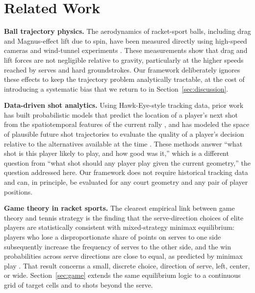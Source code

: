   \section{Related Work}\label{sec:related}

  \textbf{Ball trajectory physics.} The aerodynamics of racket-sport balls,
  including drag and Magnus-effect lift due to spin, have been measured directly
  using high-speed cameras and wind-tunnel experiments \cite{cross2014drag}.
  These measurements show that drag and lift forces are not negligible relative
  to gravity, particularly at the higher speeds reached by serves and hard
  groundstrokes. Our framework deliberately ignores these effects to keep the
  trajectory problem analytically tractable, at the cost of introducing a
  systematic bias that we return to in Section~\ref{sec:discussion}.

  \textbf{Data-driven shot analytics.} Using Hawk-Eye-style tracking data, prior
  work has built probabilistic models that predict the location of a player's
  next shot from the spatiotemporal features of the current rally
  \cite{wei2013shotlocations}, and has modeled the space of plausible future
  shot trajectories to evaluate the quality of a player's decision relative to
  the alternatives available at the time \cite{kovalchik2020voncramm}. These
  methods answer ``what shot is this player likely to play, and how good was
  it,'' which is a different question from ``what shot should any player play
  given the current geometry,'' the question addressed here. Our framework does
  not require historical tracking data and can, in principle, be evaluated for
  any court geometry and any pair of player positions.

  \textbf{Game theory in racket sports.} The clearest empirical link between
  game theory and tennis strategy is the finding that the serve-direction
  choices of elite players are statistically consistent with mixed-strategy
  minimax equilibrium: players who lose a disproportionate share of points on
  serves to one side subsequently increase the frequency of serves to the other
  side, and the win probabilities across serve directions are close to equal,
  as predicted by minimax play \cite{walker2001minimax}. That result concerns a
  small, discrete choice, direction of serve, left, center, or wide.
  Section~\ref{sec:game} extends the same equilibrium logic to a continuous grid
  of target cells and to shots beyond the serve.

